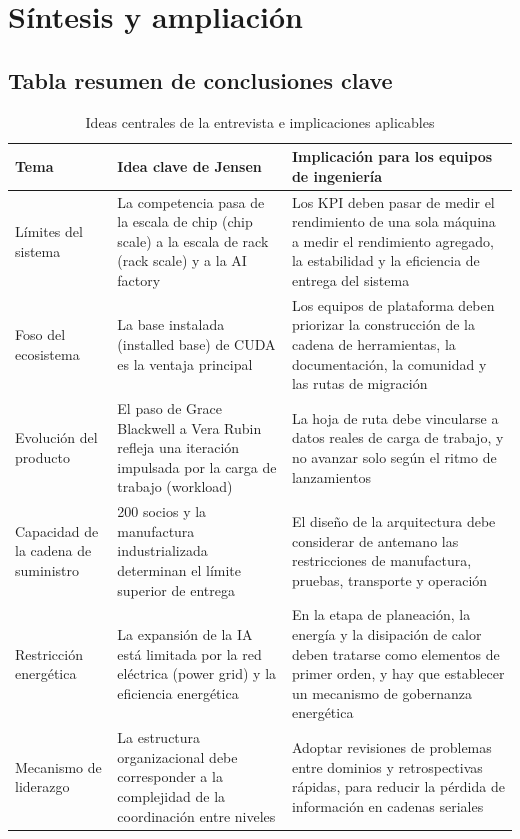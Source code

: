\section{Síntesis y ampliación}

\subsection{Tabla resumen de conclusiones clave}

\begin{table}[H]
\centering
\caption{Ideas centrales de la entrevista e implicaciones aplicables}
\begin{tabular}{p{} p{} p{}}
\toprule
Tema & Idea clave de Jensen & Implicación para los equipos de ingeniería \\
\midrule
Límites del sistema & La competencia pasa de la escala de chip (chip scale) a la escala de rack (rack scale) y a la AI factory & Los KPI deben pasar de medir el rendimiento de una sola máquina a medir el rendimiento agregado, la estabilidad y la eficiencia de entrega del sistema \\
\addlinespace
Foso del ecosistema & La base instalada (installed base) de CUDA es la ventaja principal & Los equipos de plataforma deben priorizar la construcción de la cadena de herramientas, la documentación, la comunidad y las rutas de migración \\
\addlinespace
Evolución del producto & El paso de Grace Blackwell a Vera Rubin refleja una iteración impulsada por la carga de trabajo (workload) & La hoja de ruta debe vincularse a datos reales de carga de trabajo, y no avanzar solo según el ritmo de lanzamientos \\
\addlinespace
Capacidad de la cadena de suministro & 200 socios y la manufactura industrializada determinan el límite superior de entrega & El diseño de la arquitectura debe considerar de antemano las restricciones de manufactura, pruebas, transporte y operación \\
\addlinespace
Restricción energética & La expansión de la IA está limitada por la red eléctrica (power grid) y la eficiencia energética & En la etapa de planeación, la energía y la disipación de calor deben tratarse como elementos de primer orden, y hay que establecer un mecanismo de gobernanza energética \\
\addlinespace
Mecanismo de liderazgo & La estructura organizacional debe corresponder a la complejidad de la coordinación entre niveles & Adoptar revisiones de problemas entre dominios y retrospectivas rápidas, para reducir la pérdida de información en cadenas seriales \\
\bottomrule
\end{tabular}
\end{table}

